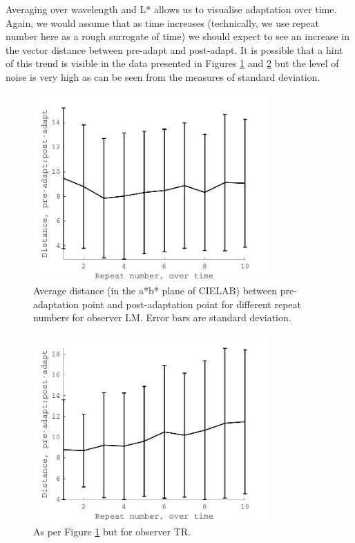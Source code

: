 Averaging over wavelength and L* allows us to visualise adaptation over time. Again, we would assume that as time increases (technically, we use repeat number here as a rough surrogate of time) we should expect to see an increase in the vector distance between pre-adapt and post-adapt. It is possible that a hint of this trend is visible in the data presented in Figures \ref{fig:LMCCI_T} and \ref{fig:TRCCI_T} but the level of noise is very high as can be seen from the measures of standard deviation.

\begin{figure}[htbp]
\includegraphics[max width=0.8\textwidth]{figs/LargeSphere/LMCCI_T.pdf}
\caption{Average distance (in the a*b* plane of CIELAB) between pre-adaptation point and post-adaptation point for different repeat numbers for observer LM. Error bars are standard deviation.}
\label{fig:LMCCI_T}
\end{figure}

\begin{figure}[htbp]
\includegraphics[max width=0.8\textwidth]{figs/LargeSphere/TRCCI_T.pdf}
\caption{As per Figure \ref{fig:LMCCI_T} but for observer TR.}
\label{fig:TRCCI_T}
\end{figure}

